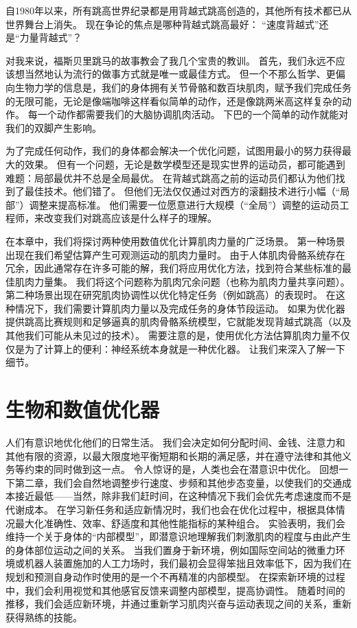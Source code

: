 自1980年以来，所有跳高世界纪录都是用背越式跳高创造的，其他所有技术都已从世界舞台上消失。
现在争论的焦点是哪种背越式跳高最好：
“速度背越式”还是“力量背越式”？


对我来说，福斯贝里跳马的故事教会了我几个宝贵的教训。
首先，我们永远不应该想当然地认为流行的做事方式就是唯一或最佳方式。
但一个不那么哲学、更偏向生物力学的信息是，我们的身体拥有关节骨骼和数百块肌肉，赋予我们完成任务的无限可能，无论是像端咖啡这样看似简单的动作，还是像跳两米高这样复杂的动作。
每一个动作都需要我们的大脑协调肌肉活动。
下巴的一个简单的动作就能对我们的双脚产生影响。


为了完成任何动作，我们的身体都会解决一个优化问题，试图用最小的努力获得最大的效果。
但有一个问题，无论是数学模型还是现实世界的运动员，都可能遇到难题：局部最优并不总是全局最优。
在背越式跳高之前的运动员们都认为他们找到了最佳技术。他们错了。
但他们无法仅仅通过对西方的滚翻技术进行小幅（“局部”）调整来提高标准。
他们需要一位愿意进行大规模（“全局”）调整的运动员工程师，来改变我们对跳高应该是什么样子的理解。


在本章中，我们将探讨两种使用数值优化计算肌肉力量的广泛场景。
第一种场景出现在我们希望估算产生可观测运动的肌肉力量时。
由于人体肌肉骨骼系统存在冗余，因此通常存在许多可能的解，我们将应用优化方法，找到符合某些标准的最佳肌肉力量集。
我们将这个问题称为肌肉冗余问题（也称为肌肉力量共享问题）。
第二种场景出现在研究肌肉协调性以优化特定任务（例如跳高）的表现时。
在这种情况下，我们需要计算肌肉力量以及完成任务的身体节段运动。
如果为优化器提供跳高比赛规则和足够逼真的肌肉骨骼系统模型，它就能发现背越式跳高（以及其他我们可能从未见过的技术）。
需要注意的是，使用优化方法估算肌肉力量不仅仅是为了计算上的便利：神经系统本身就是一种优化器。
让我们来深入了解一下细节。


\section{生物和数值优化器}

人们有意识地优化他们的日常生活。
我们会决定如何分配时间、金钱、注意力和其他有限的资源，以最大限度地平衡短期和长期的满足感，并在遵守法律和其他义务等约束的同时做到这一点。
令人惊讶的是，人类也会在潜意识中优化。
回想一下第二章，我们会自然地调整步行速度、步频和其他步态变量，以使我们的交通成本接近最低——当然，除非我们赶时间，在这种情况下我们会优先考虑速度而不是代谢成本。
在学习新任务和适应新情况时，我们也会在优化过程中，根据具体情况最大化准确性、效率、舒适度和其他性能指标的某种组合。
实验表明，我们会维持一个关于身体的“内部模型”，即潜意识地理解我们刺激肌肉的程度与由此产生的身体部位运动之间的关系。
当我们置身于新环境，例如国际空间站的微重力环境或机器人装置施加的人工力场时，我们最初会显得笨拙且效率低下，因为我们在规划和预测自身动作时使用的是一个不再精准的内部模型。
在探索新环境的过程中，我们会利用视觉和其他感官反馈来调整内部模型，提高协调性。
随着时间的推移，我们会适应新环境，并通过重新学习肌肉兴奋与运动表现之间的关系，重新获得熟练的技能。


